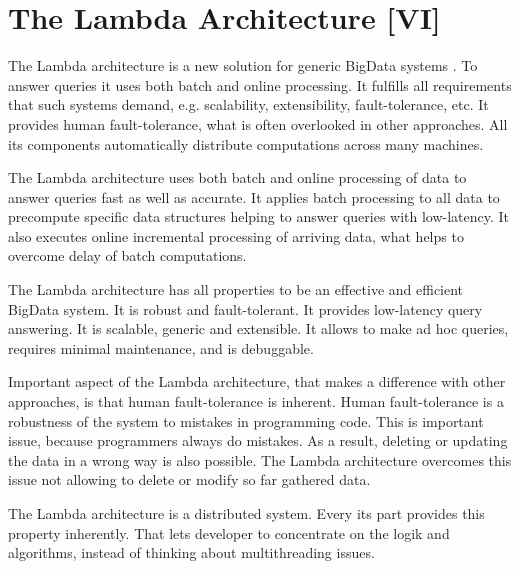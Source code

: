 \chapter{The Lambda Architecture [VI]}
\label{chap:lambda_architecture}


The Lambda architecture is a new solution for generic BigData systems \cite{MarzWarren201401}.
To answer queries it uses both batch and online processing.
It fulfills all requirements that such systems demand, e.g. scalability, extensibility, fault-tolerance, etc.
It provides human fault-tolerance, what is often overlooked in other approaches.
All its components automatically distribute computations across many machines.


The Lambda architecture uses both batch and online processing of data to answer queries fast as well as accurate.
It applies batch processing to all data to precompute specific data structures helping to answer queries with low-latency.
It also executes online incremental processing of arriving data, what helps to overcome delay of batch computations.

The Lambda architecture has all properties to be an effective and efficient BigData system.
It is robust and fault-tolerant.
It provides low-latency query answering.
It is scalable, generic and extensible.
It allows to make ad hoc queries, requires minimal maintenance, and is debuggable.

Important aspect of the Lambda architecture, that makes a difference with other approaches, is that human fault-tolerance is inherent.
Human fault-tolerance is a robustness of the system to mistakes in programming code.
This is important issue, because programmers always do mistakes.
As a result, deleting or updating the data in a wrong way is also possible.
The Lambda architecture overcomes this issue not allowing to delete or modify so far gathered data.

The Lambda architecture is a distributed system.
Every its part provides this property inherently.
That lets developer to concentrate on the logik and algorithms, instead of thinking about multithreading issues.






